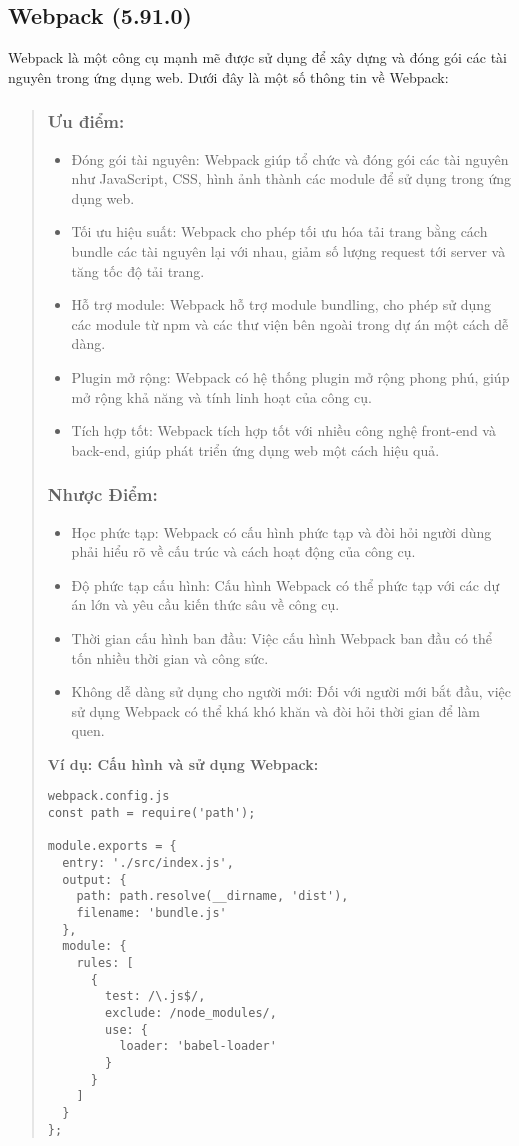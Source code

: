 \subsection{Webpack (5.91.0)}
Webpack là một công cụ mạnh mẽ được sử dụng để xây dựng và đóng gói các tài nguyên trong ứng dụng web. Dưới đây là một số thông tin về Webpack:

\begin{quote}
\subsubsection{Ưu điểm:}
\begin{itemize}
  \item Đóng gói tài nguyên: Webpack giúp tổ chức và đóng gói các tài nguyên như JavaScript, CSS, hình ảnh thành các module để sử dụng trong ứng dụng web.
  \item Tối ưu hiệu suất: Webpack cho phép tối ưu hóa tải trang bằng cách bundle các tài nguyên lại với nhau, giảm số lượng request tới server và tăng tốc độ tải trang.
  \item Hỗ trợ module: Webpack hỗ trợ module bundling, cho phép sử dụng các module từ npm và các thư viện bên ngoài trong dự án một cách dễ dàng.
  \item Plugin mở rộng: Webpack có hệ thống plugin mở rộng phong phú, giúp mở rộng khả năng và tính linh hoạt của công cụ.
  \item Tích hợp tốt: Webpack tích hợp tốt với nhiều công nghệ front-end và back-end, giúp phát triển ứng dụng web một cách hiệu quả.
\end{itemize}

\subsubsection{Nhược Điểm:}
\begin{itemize}
  \item Học phức tạp: Webpack có cấu hình phức tạp và đòi hỏi người dùng phải hiểu rõ về cấu trúc và cách hoạt động của công cụ.
  \item Độ phức tạp cấu hình: Cấu hình Webpack có thể phức tạp với các dự án lớn và yêu cầu kiến thức sâu về công cụ.
  \item Thời gian cấu hình ban đầu: Việc cấu hình Webpack ban đầu có thể tốn nhiều thời gian và công sức.
  \item Không dễ dàng sử dụng cho người mới: Đối với người mới bắt đầu, việc sử dụng Webpack có thể khá khó khăn và đòi hỏi thời gian để làm quen.
\end{itemize}

\textbf{Ví dụ: Cấu hình và sử dụng Webpack:}
\begin{lstlisting}
webpack.config.js
const path = require('path');

module.exports = {
  entry: './src/index.js',
  output: {
    path: path.resolve(__dirname, 'dist'),
    filename: 'bundle.js'
  },
  module: {
    rules: [
      {
        test: /\.js$/,
        exclude: /node_modules/,
        use: {
          loader: 'babel-loader'
        }
      }
    ]
  }
};
\end{lstlisting}
\end{quote}



